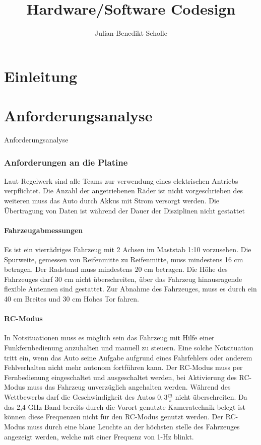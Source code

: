 \documentclass[11pt,twoside,a4paper]{mpreport}
\title{Hardware/Software Codesign}
\author{Julian-Benedikt Scholle}
\begin{document}
\maketitle
\tableofcontents

\chapter{Einleitung}

\chapter{Anforderungsanalyse} Anforderungsanalyse
\subsection{Anforderungen an die Platine}
Laut Regelwerk sind alle Teams zur verwendung eines elektrischen Antriebs verpflichtet.
Die Anzahl der angetriebenen Räder ist nicht vorgeschrieben
des weiteren muss das Auto durch Akkus mit Strom versorgt werden.
Die Übertragung von Daten ist während der Dauer der Disziplinen nicht gestattet

\subsubsection{Fahrzeugabmessungen}
Es ist ein vierrädriges Fahrzeug mit 2 Achsen im Maststab 1:10 vorzusehen. Die Spurweite, gemessen von Reifenmitte zu
Reifenmitte, muss mindestens 16 cm betragen. Der Radstand muss mindestens 20 cm betragen.
Die Höhe des Fahrzeuges darf 30 cm nicht überschreiten, über das Fahrzeug hinausragende flexible Antennen sind gestattet.
Zur Abnahme des Fahrzeuges, muss es durch ein 40 cm Breites und 30 cm Hohes Tor fahren.


\subsubsection{RC-Modus}
In Notsituationen muss es möglich sein das Fahrzeug mit Hilfe einer Funkfernbedienung anzuhalten und manuell zu steuern. Eine solche Notsituation tritt ein, wenn
das Auto seine Aufgabe aufgrund eines Fahrfehlers oder anderem Fehlverhalten nicht mehr autonom fortführen kann.
Der RC-Modus muss per Fernbedienung eingeschaltet und ausgeschaltet werden, bei Aktivierung des RC-Modus muss das Fahrzeug unverzüglich angehalten werden.
Während des Wettbewerbs darf die Geschwindigkeit des Autos $0,3\frac{m}{s}$ nicht überschreiten.
Da das 2,4-GHz Band bereits durch die Vorort genutzte Kameratechnik belegt ist können diese Frequenzen nicht für den RC-Modus genutzt werden.
Der RC-Modus muss durch eine blaue Leuchte an der höchsten stelle des Fahrzeuges angezeigt werden, welche mit einer Frequenz von 1-Hz blinkt.
\end{document}
